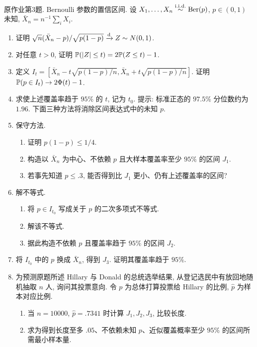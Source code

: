 \begin{exercise}\label{ps01:p03}
原作业第3题. Bernoulli 参数的置信区间. 设 $X_1,\ldots,X_n\stackrel{\mathrm{i.i.d.}}{\sim}\operatorname{Ber}(p)$, $p\in(0,1)$ 未知, $\bar X_n=n^{-1}\sum_iX_i$.
\begin{enumerate}[label=\arabic*.]
\item 证明 $\sqrt n(\bar X_n-p)/\sqrt{p(1-p)}\xrightarrow{\mathrm d} Z\sim N(0,1)$.
\item 对任意 $t>0$, 证明 $\mathbb P(|Z|\le t)=2\mathbb P(Z\le t)-1$.
\item 定义 $I_t=[\bar X_n-t\sqrt{p(1-p)/n},\bar X_n+t\sqrt{p(1-p)/n}]$. 证明 $\mathbb P(p\in I_t)\to2\Phi(t)-1$.
\item 求使上述覆盖率趋于 $95\%$ 的 $t$, 记为 $t_0$. 提示: 标准正态的 $97.5\%$ 分位数约为 $1.96$. 下面三种方法将消除区间表达式中的未知 $p$.
\item 保守方法.
\begin{enumerate}[label=(\alph*)]
\item 证明 $p(1-p)\le1/4$.
\item 构造以 $\bar X_n$ 为中心、不依赖 $p$ 且大样本覆盖率至少 $95\%$ 的区间 $J_1$.
\item 若事先知道 $p\le.3$, 能否得到比 $J_1$ 更小、仍有上述覆盖率的区间?
\end{enumerate}
\item 解不等式.
\begin{enumerate}[label=(\alph*)]
\item 将 $p\in I_{t_0}$ 写成关于 $p$ 的二次多项式不等式.
\item 解该不等式.
\item 据此构造不依赖 $p$ 且覆盖率趋于 $95\%$ 的区间 $J_2$.
\end{enumerate}
\item 将 $I_{t_0}$ 中的 $p$ 换成 $\bar X_n$, 得到 $J_3$. 证明其覆盖率趋于 $95\%$.
\item 为预测原题所述 Hillary 与 Donald 的总统选举结果, 从登记选民中有放回地随机抽取 $n$ 人, 询问其投票意向. 令 $p$ 为总体打算投票给 Hillary 的比例, $\hat p$ 为样本对应比例.
\begin{enumerate}[label=(\alph*)]
\item 当 $n=10000$, $\hat p=.7341$ 时计算 $J_1,J_2,J_3$, 比较长度.
\item 求为得到长度至多 $.05$、不依赖未知 $p$、近似覆盖概率至少 $95\%$ 的区间所需最小样本量.
\end{enumerate}
\end{enumerate}
\end{exercise}
